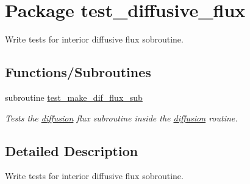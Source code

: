 \hypertarget{a00083}{
\section{Package test\_\-diffusive\_\-flux}
\label{a00083}
}
Write tests for interior diffusive flux sobroutine.  


\subsection*{Functions/Subroutines}
\begin{CompactItemize}
\item 
\hypertarget{a00083_b0d97c4f405a9d93d994b7bd2fd0cfda}{
subroutine \hyperlink{a00083_b0d97c4f405a9d93d994b7bd2fd0cfda}{test\_\-make\_\-dif\_\-flux\_\-sub}}
\label{a00083_b0d97c4f405a9d93d994b7bd2fd0cfda}

\begin{CompactList}\small\item\em Tests the \hyperlink{a00056}{diffusion} flux subroutine inside the \hyperlink{a00056}{diffusion} routine. \item\end{CompactList}\end{CompactItemize}


\subsection{Detailed Description}
Write tests for interior diffusive flux sobroutine. 

